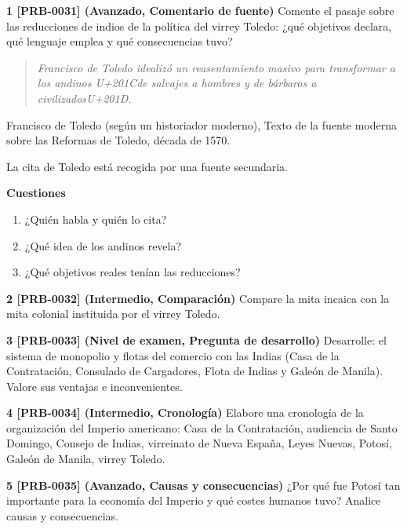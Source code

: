 \documentclass{book}
\begin{document}
\begin{tcolorbox}[title={Ejercicios}, studiumworked, breakable]

\noindent\textbf{1 [PRB-0031] (Avanzado, Comentario de fuente)}
Comente el pasaje sobre las reducciones de indios de la política del virrey Toledo: ¿qué objetivos declara, qué lenguaje emplea y qué consecuencias tuvo?


\begin{quote}
\itshape Francisco de Toledo idealizó un reasentamiento masivo para transformar a los andinos {U+201C}de salvajes a hombres y de bárbaros a civilizados{U+201D}.
\end{quote}
{\noindent\footnotesize Francisco de Toledo (según un historiador moderno), Texto de la fuente moderna sobre las Reformas de Toledo, década de 1570.\par}
{\noindent\footnotesize La cita de Toledo está recogida por una fuente secundaria.\par}

\noindent\textbf{Cuestiones}
\begin{enumerate}
\item ¿Quién habla y quién lo cita?
\item ¿Qué idea de los andinos revela?
\item ¿Qué objetivos reales tenían las reducciones?
\end{enumerate}

\noindent\textbf{2 [PRB-0032] (Intermedio, Comparación)}
Compare la mita incaica con la mita colonial instituida por el virrey Toledo.


\noindent\textbf{3 [PRB-0033] (Nivel de examen, Pregunta de desarrollo)}
Desarrolle: el sistema de monopolio y flotas del comercio con las Indias (Casa de la Contratación, Consulado de Cargadores, Flota de Indias y Galeón de Manila). Valore sus ventajas e inconvenientes.


\noindent\textbf{4 [PRB-0034] (Intermedio, Cronología)}
Elabore una cronología de la organización del Imperio americano: Casa de la Contratación, audiencia de Santo Domingo, Consejo de Indias, virreinato de Nueva España, Leyes Nuevas, Potosí, Galeón de Manila, virrey Toledo.


\noindent\textbf{5 [PRB-0035] (Avanzado, Causas y consecuencias)}
¿Por qué fue Potosí tan importante para la economía del Imperio y qué costes humanos tuvo? Analice causas y consecuencias.

\end{tcolorbox}
\end{document}
